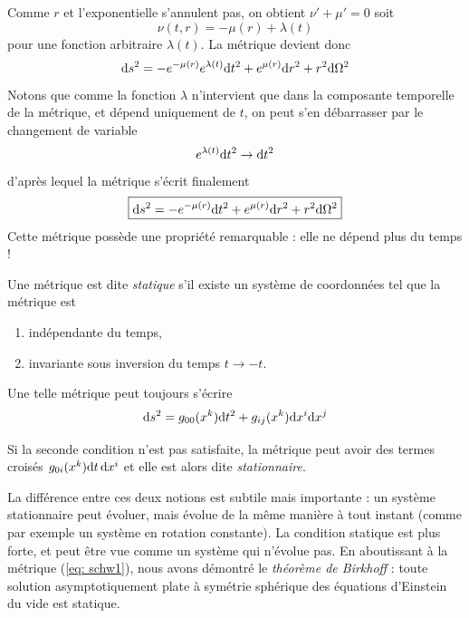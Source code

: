 Comme $r$ et l'exponentielle s'annulent pas, on obtient $\nu' + \mu' = 0$ soit
\begin{equation}
    \nu (t,r) = - \mu(r) + \lambda (t)
\end{equation}
pour une fonction arbitraire $\lambda (t)$. La métrique devient donc
\begin{equation}
    \mathrm{d} s^2 = - e^{-\mu(r)} e^{\lambda (t)} \mathrm{d} t^2 + e^{\mu(r)} \mathrm{d} r^2 + r^2 \mathrm{d} \Omega^2
\end{equation}
Notons que comme la fonction $\lambda$ n'intervient que dans la composante temporelle de la métrique, et dépend uniquement de $t$, on peut s'en débarrasser par le changement de variable 
\begin{equation}
    e^{\lambda(t)} \mathrm{d} t^2 \to \mathrm{d} t^2
\end{equation}
d'après lequel la métrique s'écrit finalement
\begin{equation}
    \label{eq: schw1}
    \boxed{\mathrm{d} s^2 = - e^{-\mu(r)} \mathrm{d} t^2 + e^{\mu(r)} \mathrm{d} r^2 + r^2 \mathrm{d} \Omega^2}
\end{equation}
Cette métrique possède une propriété remarquable : elle ne dépend plus du temps !
\begin{theoremframe}
    \begin{defi}
        Une métrique est dite \emph{statique} s'il existe un système de coordonnées tel que la métrique est
        \begin{enumerate}[label= \roman*.]
            \item indépendante du temps,
            \item invariante sous inversion du temps $t \to -t$.
        \end{enumerate}
    \end{defi}
\end{theoremframe}
Une telle métrique peut toujours s'écrire 
\begin{equation}
    \mathrm{d} s^2 = g_{00}(x^k) \mathrm{d} t^2 + g_{ij} (x^k) \mathrm{d} x^i \mathrm{d} x^j
\end{equation}
\begin{rmk}
    Si la seconde condition n'est pas satisfaite, la métrique peut avoir des termes croisés $g_{0i} (x^k) \mathrm{d} t\, \mathrm{d} x^i$ et elle est alors dite \emph{stationnaire}.
\end{rmk}
La différence entre ces deux notions est subtile mais importante : un système stationnaire peut évoluer, mais évolue de la même manière à tout instant (comme par exemple un système en rotation constante). La condition statique est plus forte, et peut être vue comme un système qui n'évolue pas. En aboutissant à la métrique (\ref{eq: schw1}), nous avons démontré le \emph{théorème de Birkhoff} : toute solution asymptotiquement plate à symétrie sphérique des équations d'Einstein du vide est statique.
